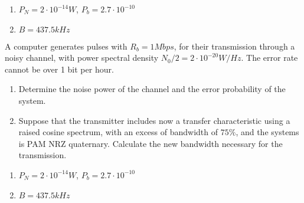 \documentclass[idioma,boletin]{uah}
\begin{document}
{

\begin{enumerate}
	\item $P_N = 2 \cdot 10^{-14} W$, $P_b = 2.7 \cdot 10^{-10}$
	\item $B=437.5 kHz$
\end{enumerate}
}
{

A computer generates pulses with $R_b = 1 Mbps$, for their transmission through a noisy channel, with power spectral density $N_0/2 = 2\cdot 10^{-20} W/Hz$. The error rate cannot be over 1 bit per hour.

\begin{enumerate}
	\item Determine the noise power of the channel and the error probability of the system.
	\item Suppose that the transmitter includes now a transfer characteristic using a raised cosine spectrum, with an excess of bandwidth of $75\%$, and the systems is PAM NRZ quaternary. Calculate the new bandwidth necessary for the transmission.
\end{enumerate}

}
{

\begin{enumerate}
	\item $P_N = 2 \cdot 10^{-14} W$, $P_b = 2.7 \cdot 10^{-10}$
	\item $B=437.5 kHz$
\end{enumerate}
}
\end{document}
